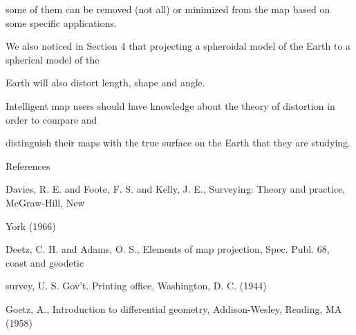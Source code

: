 \documentclass[a4paper,portrait,12pt]{article}
\begin{document}
\begin{flushleft}
some of them can be removed (not all) or minimized from the map based on some specific applications.
\end{flushleft}


\begin{flushleft}
We also noticed in Section 4 that projecting a spheroidal model of the Earth to a spherical model of the
\end{flushleft}


\begin{flushleft}
Earth will also distort length, shape and angle.
\end{flushleft}


\begin{flushleft}
Intelligent map users should have knowledge about the theory of distortion in order to compare and
\end{flushleft}


\begin{flushleft}
distinguish their maps with the true surface on the Earth that they are studying.
\end{flushleft}





\begin{flushleft}
References
\end{flushleft}


\begin{flushleft}
[1] Davies, R. E. and Foote, F. S. and Kelly, J. E., Surveying: Theory and practice, McGraw-Hill, New
\end{flushleft}


\begin{flushleft}
York (1966)
\end{flushleft}


\begin{flushleft}
[2] Deetz, C. H. and Adams, O. S., Elements of map projection, Spec. Publ. 68, coast and geodetic
\end{flushleft}


\begin{flushleft}
survey, U. S. Gov't. Printing office, Washington, D. C. (1944)
\end{flushleft}


\begin{flushleft}
[3] Goetz, A., Introduction to differential geometry, Addison-Wesley, Reading, MA (1958)
\end{flushleft}
\end{document}

